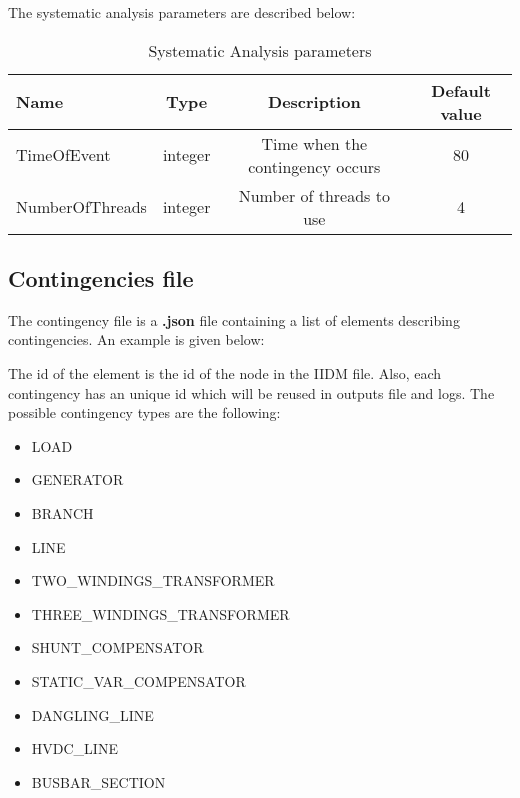 \documentclass[a4paper, 12pt]{report}
\begin{document}
The systematic analysis parameters are described below:

\begin{table}[h!]
\center
\begin{tabular}{ l | c | c | c }
\toprule
\textbf{{Name}} & \textbf{{Type}} & \textbf{{Description}} & \textbf{{Default value}}\\
\midrule
TimeOfEvent & integer & Time when the contingency occurs & 80 \\
NumberOfThreads & integer & Number of threads to use & 4 \\
\bottomrule
\end{tabular}
\caption{Systematic Analysis parameters}
\end{table}

\subsection{Contingencies file}

The contingency file is a \textbf{.json} file containing a list of elements describing contingencies. An example is given below:


The id of the element is the id of the node in the IIDM file.
Also, each contingency has an unique id which will be reused in outputs file and logs.
The possible contingency types are the following:
\begin{itemize}
  \item LOAD
  \item GENERATOR
  \item BRANCH
  \item LINE
  \item TWO\_WINDINGS\_TRANSFORMER
  \item THREE\_WINDINGS\_TRANSFORMER
  \item SHUNT\_COMPENSATOR
  \item STATIC\_VAR\_COMPENSATOR
  \item DANGLING\_LINE
  \item HVDC\_LINE
  \item BUSBAR\_SECTION
\end{itemize}
\end{document}
